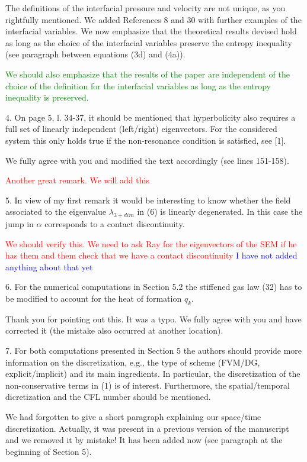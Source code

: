 \documentclass{article}
\newcommand{\tcr}[1]{\textcolor{red}{#1}}
\newcommand{\tcb}[1]{\textcolor{blue}{#1}}
\newcommand{\tcg}[1]{\textcolor{green}{#1}}
\begin{document}
The definitions of the interfacial pressure and velocity are not unique, as you rightfully mentioned. 
We added References 8 and 30 with further examples of the interfacial variables. We now emphasize 
that the theoretical results devised hold as long as the choice of the interfacial
variables preserve the entropy inequality (see paragraph between equations (3d) and (4a)). 

\tcg{We should also emphasize that the
results of the paper are independent of the choice of the definition for the interfacial variables as long as the entropy inequality is preserved.}
\bigskip


{\color{blue}
4. On page 5, l. 34-37, it should be mentioned that hyperbolicity also requires a full
set of linearly independent (left/right) eigenvectors. For the considered system this
only holds true if the non-resonance condition is satisfied, see [1].
}

We fully agree with you and modified the text accordingly (see lines 151-158).

\tcr{Another great remark. We will add this}
\bigskip


{\color{blue}
5. In view of my first remark it would be interesting to know whether the field associated
to the eigenvalue $\lambda_{3+dim}$ in (6) is linearly degenerated. In this case the jump in $\alpha$
corresponds to a contact discontinuity.
}

\tcr{We should verify this. We need to ask Ray for the eigenvectors of the SEM if he has them and them check that
we have a contact discontinuity} \tcb{I have not added anything about that yet}
\bigskip


{\color{blue}
6. For the numerical computations in Section 5.2 the stiffened gas law (32) has to be
modified to account for the heat of formation $q_k$.}

Thank you for pointing out this. It was a typo. We fully agree with you and have corrected it (the mistake
also occurred at another location).
\bigskip


{\color{blue}
7. For both computations presented in Section 5 the authors should provide more 
information on the discretization, e.g., the type of scheme (FVM/DG, explicit/implicit)
and its main ingredients. In particular, the discretization of the non-conservative
terms in (1) is of interest. Furthermore, the spatial/temporal dicretization and the
CFL number should be mentioned.}

We had forgotten to give a short paragraph explaining our space/time discretization.
Actually, it was present in a previous version of the manuscript and we removed it by mistake! 
It has  been added now (see paragraph at the beginning of Section 5).
\bigskip
\end{document}
